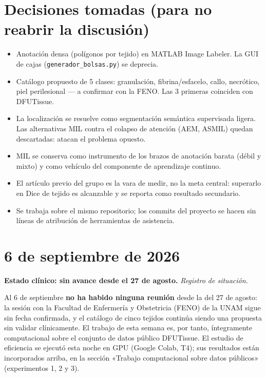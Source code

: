 \documentclass[12pt,letterpaper]{report}
\newcommand{\entrada}[2]{%
    \vspace{0.6em}
    \noindent\textbf{#1.} \textit{#2}
    \vspace{0.3em}
    \par
}
\begin{document}
\section{Decisiones tomadas (para no reabrir la discusión)}

\begin{itemize}[leftmargin=1.5em]
    \item Anotación densa (polígonos por tejido) en MATLAB Image Labeler. La GUI de cajas
        (\texttt{generador\_bolsas.py}) se deprecia.
    \item Catálogo propuesto de 5 clases: granulación, fibrina/esfacelo, callo, necrótico, piel
        perilesional --- a confirmar con la FENO. Las 3 primeras coinciden con DFUTissue.
    \item La localización se resuelve como segmentación semántica supervisada ligera. Las alternativas
        MIL contra el colapso de atención (AEM, ASMIL) quedan descartadas: atacan el problema opuesto.
    \item MIL se conserva como instrumento de los brazos de anotación barata (débil y mixto) y como
        vehículo del componente de aprendizaje continuo.
    \item El artículo previo del grupo es la vara de medir, no la meta central: superarlo en Dice de
        tejido es alcanzable y se reporta como resultado secundario.
    \item Se trabaja sobre el mismo repositorio; los commits del proyecto se hacen sin líneas de
        atribución de herramientas de asistencia.
\end{itemize}

\section{6 de septiembre de 2026}

\entrada{Estado clínico: sin avance desde el 27 de agosto}{Registro de situación.}

Al 6 de septiembre \textbf{no ha habido ninguna reunión} desde la del 27 de agosto: la sesión con la
Facultad de Enfermería y Obstetricia (FENO) de la UNAM sigue sin fecha confirmada, y el catálogo de
cinco tejidos continúa siendo una propuesta sin validar clínicamente. El trabajo de esta semana es,
por tanto, íntegramente computacional sobre el conjunto de datos público DFUTissue. El estudio de
eficiencia se ejecutó esta noche en GPU (Google Colab, T4); sus resultados están incorporados arriba,
en la sección «Trabajo computacional sobre datos públicos» (experimentos 1, 2 y 3).
\end{document}
